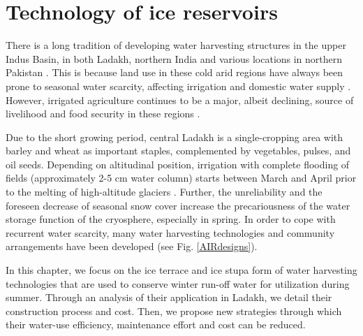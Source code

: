 \chapter{Technology of ice reservoirs}


There is a long tradition of developing water harvesting structures in the upper Indus Basin, in both Ladakh,
northern India \citep{Labbal2000, nusser 2012} and various locations in northern Pakistan \citep{kreutzman2011,
nusser2017}. This is because land use in these cold arid regions have always been prone to seasonal water
scarcity, affecting irrigation and domestic water supply \citep{dameandmakelow2010, nusserandbaghel2016}.
However, irrigated agriculture continues to be a major, albeit declining, source of livelihood and food security
in these regions \cite{dameandnusser2011}. 

Due to the short growing period, central Ladakh is a single-cropping area with barley and wheat as important
staples, complemented by vegetables, pulses, and oil seeds. Depending on altitudinal position, irrigation with
complete flooding of fields (approximately 2-5 cm water column) starts between March and April prior to the
melting of high-altitude glaciers \citep{nusserSociohydrologyArtificialGlaciers2019}. Further, the unreliability
and the foreseen decrease of seasonal snow cover \citep{chevuturi2018} increase the precariousness of the water
storage function of the cryosphere, especially in spring. In order to cope with recurrent water scarcity, many
water harvesting technologies and community arrangements have been developed
\citep{nusserSociohydrologyArtificialGlaciers2019} (see Fig. \ref{AIRdesigns}). 

In this chapter, we focus on the ice terrace and ice stupa form of water harvesting technologies that are used
to conserve winter run-off water for utilization during summer. Through an analysis of their application in
Ladakh, we detail their construction process and cost. Then, we propose new strategies through which their
water-use efficiency, maintenance effort and cost can be reduced.

